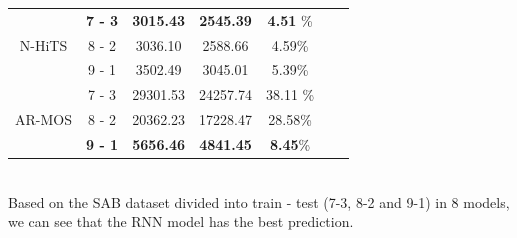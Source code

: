\documentclass{ieeeojies}
\begin{document}
{\begin{tabular}{|c|c|c|c|c|c|c|}
     \hline
     \multirow{3}{*}{N-HiTS} & \textbf{7 - 3} & \textbf{3015.43} & \textbf{2545.39} & \textbf{4.51} \%\\
      \cline{2-5}
     & 8 - 2 & 3036.10 & 2588.66 & 4.59\% \\
      \cline{2-5}
     & 9 - 1 & 3502.49 & 3045.01 & 5.39\% \\
       \hline
     \multirow{3}{*}{AR-MOS} & 7 - 3 & 29301.53 & 24257.74 & 38.11 \%\\
      \cline{2-5}
     & 8 - 2 & 20362.23 & 17228.47 & 28.58\% \\
      \cline{2-5}
     & \textbf{9 - 1} & \textbf{5656.46} & \textbf{4841.45} & \textbf{8.45}\% \\
     \hline
     \end{tabular}%
     }
     \\ Based on the SAB dataset divided into train - test (7-3, 8-2 and 9-1) in 8 models, we can see that the RNN model has the best prediction.
\end{document}
